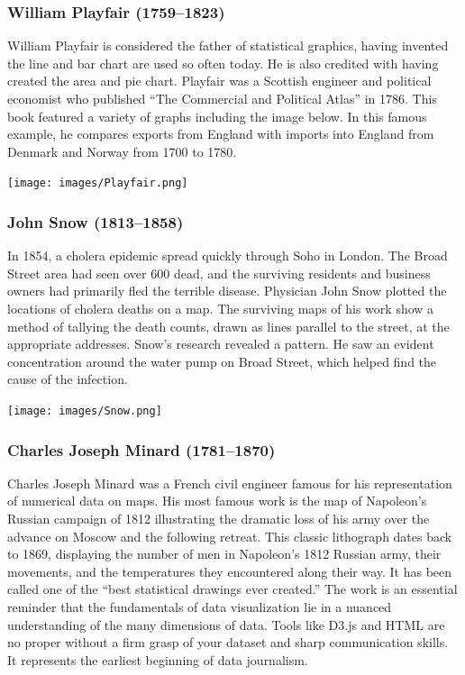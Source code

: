 \documentclass[]{book}
\begin{document}
\hypertarget{william-playfair-17591823}{%
\subsubsection{William Playfair (1759--1823)}\label{william-playfair-17591823}}

William Playfair is considered the father of statistical graphics, having invented the line and bar chart are used so often today. He is also credited with having created the area and pie chart. Playfair was a Scottish engineer and political economist who published ``The Commercial and Political Atlas'' in 1786. This book featured a variety of graphs including the image below. In this famous example, he compares exports from England with imports into England from Denmark and Norway from 1700 to 1780.

\texttt{[image: images/Playfair.png]}

\hypertarget{john-snow-18131858}{%
\subsubsection{John Snow (1813--1858)}\label{john-snow-18131858}}

In 1854, a cholera epidemic spread quickly through Soho in London. The Broad Street area had seen over 600 dead, and the surviving residents and business owners had primarily fled the terrible disease. Physician John Snow plotted the locations of cholera deaths on a map. The surviving maps of his work show a method of tallying the death counts, drawn as lines parallel to the street, at the appropriate addresses. Snow's research revealed a pattern. He saw an evident concentration around the water pump on Broad Street, which helped find the cause of the infection.

\texttt{[image: images/Snow.png]}

\hypertarget{charles-joseph-minard-17811870}{%
\subsubsection{Charles Joseph Minard (1781--1870)}\label{charles-joseph-minard-17811870}}

Charles Joseph Minard was a French civil engineer famous for his representation of numerical data on maps. His most famous work is the map of Napoleon's Russian campaign of 1812 illustrating the dramatic loss of his army over the advance on Moscow and the following retreat. This classic lithograph dates back to 1869, displaying the number of men in Napoleon's 1812 Russian army, their movements, and the temperatures they encountered along their way. It has been called one of the ``best statistical drawings ever created.'' The work is an essential reminder that the fundamentals of data visualization lie in a nuanced understanding of the many dimensions of data. Tools like D3.js and HTML are no proper without a firm grasp of your dataset and sharp communication skills. It represents the earliest beginning of data journalism.
\end{document}
